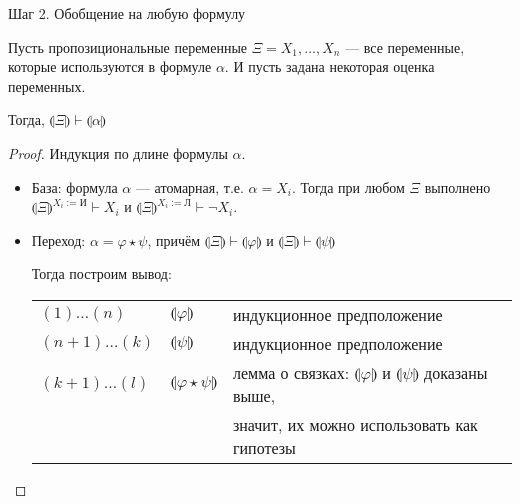 \documentclass[aspectratio=169]{beamer}
\begin{document}
\begin{frame}{Шаг 2. Обобщение на любую формулу}

\begin{lemmarus}
Пусть пропозициональные переменные $\Xi = X_1, \dots, X_n$ ---
все переменные, которые используются в формуле $\alpha$. И пусть
задана некоторая оценка переменных.

Тогда, $\llparenthesis \Xi \rrparenthesis \vdash\llparenthesis\alpha\rrparenthesis$
\end{lemmarus}\pause

\begin{proof}Индукция по длине формулы $\alpha$.
\begin{itemize}
\item База: формула $\alpha$ --- атомарная, т.е. $\alpha = X_i$. Тогда при любом $\Xi$ выполнено 
$\llparenthesis\Xi\rrparenthesis^{X_i := \text{И}} \vdash X_i$ и $\llparenthesis\Xi\rrparenthesis^{X_i := \text{Л}} \vdash \neg X_i$.
\item Переход: $\alpha = \varphi\star\psi$, причём $\llparenthesis\Xi\rrparenthesis\vdash\llparenthesis\varphi\rrparenthesis$
и $\llparenthesis\Xi\rrparenthesis\vdash\llparenthesis\psi\rrparenthesis$\pause

Тогда построим вывод: 

\begin{tabular}{lll}
$(1)\dots(n)$ & $\llparenthesis\varphi\rrparenthesis$ & индукционное предположение\\
$(n+1)\dots(k)$ & $\llparenthesis\psi\rrparenthesis$ & индукционное предположение\\
$(k+1)\dots(l)$ & $\llparenthesis\varphi\star\psi\rrparenthesis$ & 
  лемма о связках: $\llparenthesis\varphi\rrparenthesis$ и $\llparenthesis\psi\rrparenthesis$ доказаны выше,\\
  & & значит, их можно использовать как гипотезы
\end{tabular}
\end{itemize}
\end{proof}

\end{frame}
\end{document}
